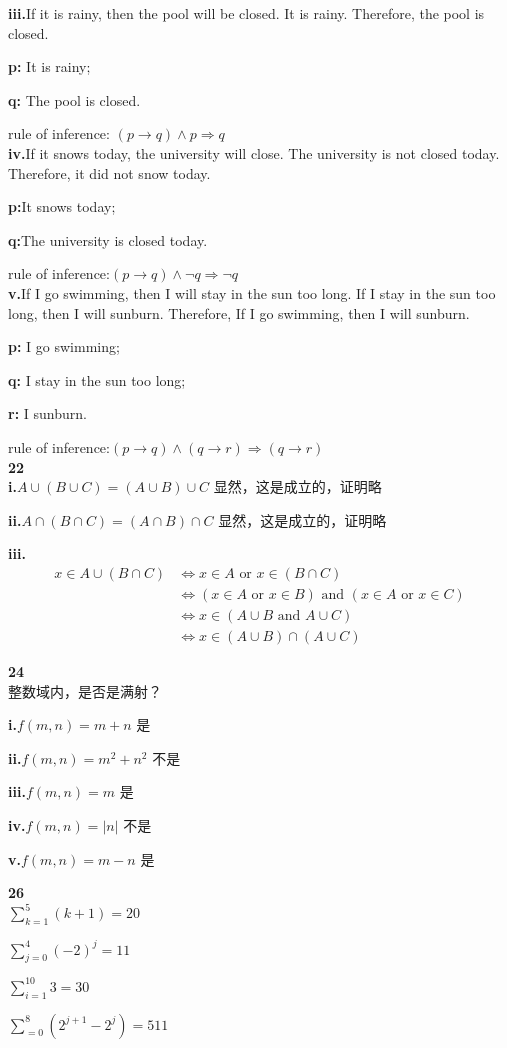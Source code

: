\documentclass[UTF8]{ctexart}
\begin{document}
\textbf{iii.}If it is rainy, then the pool will be closed. It is rainy. Therefore, the pool is closed.

\textbf{p:} It is rainy;

\textbf{q:} The pool is closed.

rule of inference: $(p \rightarrow q) \wedge p \Rightarrow q$\\

\textbf{iv.}If it snows today, the university will close. The university is not closed today. Therefore, it did not snow today.

\textbf{p:}It snows today;

\textbf{q:}The university is closed today.

rule of inference:$(p\rightarrow q)\wedge \neg q \Rightarrow \neg q$\\

\textbf{v.}If I go swimming, then I will stay in the sun too long. If I stay in the sun too long, then I will sunburn. Therefore, If I go swimming, then I will sunburn.

\textbf{p:} I go swimming;

\textbf{q:} I stay in the sun too long;

\textbf{r:} I sunburn.

rule of inference:$(p\rightarrow q)\wedge (q\rightarrow r)\Rightarrow (q\rightarrow r)$\\

\noindent\textbf{22}\\

\textbf{i.}$A\cup(B\cup C)=(A\cup B) \cup C$ 显然，这是成立的，证明略

\textbf{ii.}$A\cap(B\cap C)=(A\cap B) \cap C$ 显然，这是成立的，证明略

\textbf{iii.}
\begin{equation}
\nonumber
\begin{split}
x\in A\cup (B\cap C) 
&\Leftrightarrow x\in A \mbox{ or }x \in (B \cap C)\\
&\Leftrightarrow (x \in A \mbox{ or } x\in B) \mbox{ and } (x \in A  \mbox{ or }  x\in C)\\
&\Leftrightarrow x\in (A\cup B \mbox{ and }A \cup C)\\
&\Leftrightarrow x \in (A\cup B) \cap (A \cup C)
\end{split}
\end{equation}

\noindent\textbf{24}\\

整数域内，是否是满射？

\textbf{i.}$f(m,n)=m+n$ 是

\textbf{ii.}$f(m,n)=m^2+n^2$ 不是

\textbf{iii.}$f(m,n)=m$ 是

\textbf{iv.}$f(m,n)=|n|$ 不是

\textbf{v.}$f(m,n)=m-n$ 是


\noindent\textbf{26}\\

$\sum_{k=1}^{5}(k+1)=20$

$\sum_{j=0}^{4}(-2)^j=11$

$\sum_{i=1}^{10}3=30$

$\sum_{=0}^{8}(2^{j+1}-2^{j})=511$
\end{document}
